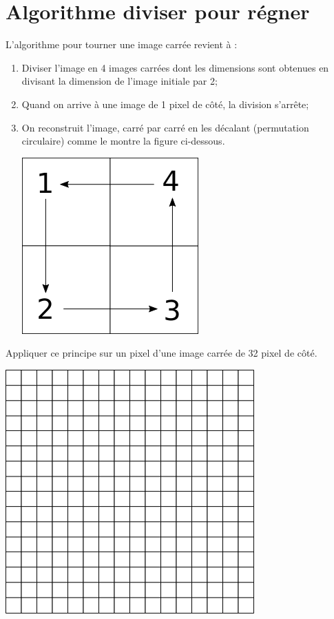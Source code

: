 \documentclass[11pt,a4paper]{article}
\newcounter{num}
\begin{document}
\section*{Algorithme diviser pour régner}

L'algorithme pour tourner une image carrée revient à :


\begin{enumerate}

\item Diviser l'image en 4 images carrées dont les dimensions sont obtenues en divisant la dimension de l'image initiale par 2;

\item Quand on arrive à une image de 1 pixel de côté, la division s'arrête;

\item On reconstruit l'image, carré par carré en les décalant (permutation circulaire) comme le montre la figure ci-dessous.

\begin{center}
\includegraphics[scale=0.6]{../img/quart_tour_decalage.png}
\end{center}

\end{enumerate}

Appliquer ce principe sur un pixel d'une image carrée de 32 pixel de côté.


\begin{center}
\includegraphics[scale=1]{../img/quart_tour_grille_32_pixel.png}
\end{center}
\end{document}
